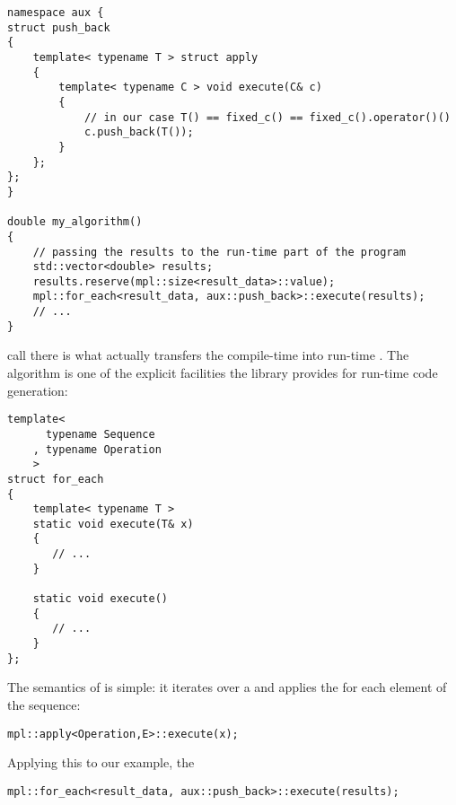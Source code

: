 \documentclass{kapproc}
\begin{document}
{\small
\begin{codesamp}\begin{verbatim}
namespace aux {
struct push_back
{
    template< typename T > struct apply
    {
        template< typename C > void execute(C& c)
        {
            // in our case T() == fixed_c() == fixed_c().operator()()
            c.push_back(T());
        }
    };
};
}

double my_algorithm()
{
    // passing the results to the run-time part of the program
    std::vector<double> results;
    results.reserve(mpl::size<result_data>::value);
    mpl::for_each<result_data, aux::push_back>::execute(results);
    // ...
}
\end{verbatim}
\end{codesamp}
}

 call there is what actually 
transfers the compile-time  into run-time 
. The  algorithm 
is one of the explicit facilities the library provides for run-time 
code generation:

{\small
\begin{codesamp}\begin{verbatim}
template<
      typename Sequence
    , typename Operation
    >
struct for_each
{
    template< typename T >
    static void execute(T& x)
    {
       // ...
    }

    static void execute()
    {
       // ...
    }
};
\end{verbatim}
\end{codesamp}
}

The semantics of  is simple: it 
iterates over a  and applies the 
for each element  of the sequence:

{\small
\begin{codesamp}\begin{verbatim}
mpl::apply<Operation,E>::execute(x);
\end{verbatim}
\end{codesamp}
}

Applying this to our example, the 

{\small
\begin{codesamp}\begin{verbatim}
mpl::for_each<result_data, aux::push_back>::execute(results);
\end{verbatim}
\end{codesamp}
}
\end{document}

